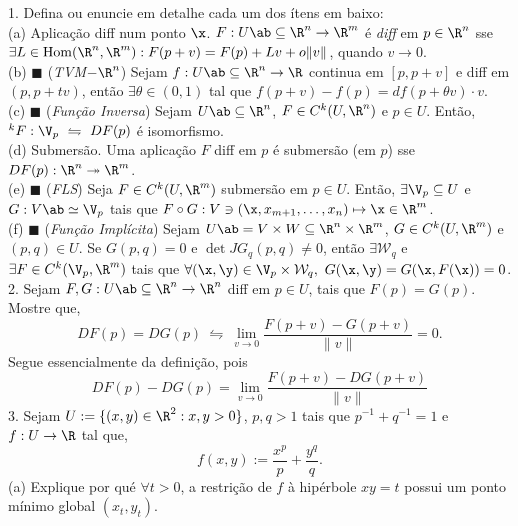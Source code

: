 \newcommand{\F}{\mathbb{F}}
\newcommand{\C}{\mathbb{C}}
\newcommand{\an}{\mathscr{A}} 
\newcommand{\Q}{\mathbb{Q}}
\renewcommand{\hom}{\operatorname{Hom}}
\newcommand{\ehom}{\operatorname{End}}

1. Defina ou enuncie em detalhe cada um dos ítens em baixo: \\
(a) Aplicação diff num ponto \(\x\). \textcolor{gris}{\(F: U\ab \subseteq \R^n \to \R^m\) é \emph{diff} em \(p \in \R^n\) sse \(\exists L \in \hom(\R^n, \R^m): F(p+v) = F(p) + Lv + o\|v\|\), quando \(v\to 0\). }\\ 
(b) \(\blacksquare\) (\emph{TVM\(-\R^n\)}) \textcolor{gris}{Sejam \(f: U\ab \subseteq \R^n \to \R\) continua em \([p, p+v]\) e diff em \((p,p+tv)\), então \(\exists \theta \in (0,1)\) tal que \( f(p+v) - f(p) = df(p + \theta v) \cdot v \).   }\\ 
(c) \(\blacksquare\) (\emph{Função Inversa}) \textcolor{gris}{Sejam \(U\ab \subseteq \R^n\), \(F \in C^k(U,\R^n)\) e \(p\in U\). Então, \(^kF: \V_p \ \leftrightharpoons \ DF(p)\) é isomorfismo.  }\\ 
(d) Submersão. \textcolor{gris}{Uma aplicação \(F\) diff em \(p\) é submersão (em \(p\)) sse \(DF(p): \R^n \twoheadrightarrow \R^m\). }\\
(e) \(\blacksquare\) (\emph{FLS}) \textcolor{gris}{Seja \(F\in C^k(U,\R^m)\) submersão em \(p\in U\). Então, \(\exists \V_p \subseteq U\) e \(G:V\ab \simeq \V_p\) tais que \(F\circ G: V \ni (\x, x_{m+1}, \ldots, x_n) \mapsto \x \in \R^m\). }\\
(f) \(\blacksquare\) (\emph{Função Implícita}) \textcolor{gris}{Sejam \(U\ab = V\times W \subseteq \R^n \times \R^m\), \(G \in C^k(U,\R^m)\) e \((p,q) \in U\). Se \(G(p,q)=0\) e \(\det JG_q(p,q) \neq 0\), então \(\exists \mathcal{W}_q\) e \(\exists F \in C^k(\V_p, \R^m)\) tais que \(\forall (\x,\y) \in \V_p\times \mathcal{W}_q, \ G(\x,\y) = G(\x, F(\x)) = 0\). }\\ 
2. Sejam \(F,G: U\ab \subseteq \R^n \to \R^n\) diff em \(p \in U\), tais que \(F(p) = G(p)\). Mostre que,
\[DF(p) = DG(p) \ \leftrightharpoons \ \lim_{v\to 0} \frac{F(p+v) - G(p+v)}{\|v\|} = 0. \]
\textcolor{gris}{
    Segue essencialmente da definição, pois 
    \[DF(p) - DG(p) = \lim_{v\to 0} \frac{F(p+v) -DG(p+v)}{\|v\|}\] 
}
\hspace{-0.1cm}3. Sejam \(U:= \{(x,y) \in \R^2 : x,y >0 \}\), \(p,q >1\) tais que \(p^{-1} + q^{-1} = 1\) e \(f: U \to \R\) tal que, 
\[f(x,y) := \frac{x^p}{p} + \frac{y^q}{q}.\] 
(a) Explique por qué \(\forall t>0\), a restrição de \(f\) à hipérbole \(xy = t\) possui um ponto mínimo global \((x_t, y_t)\). \\ 
